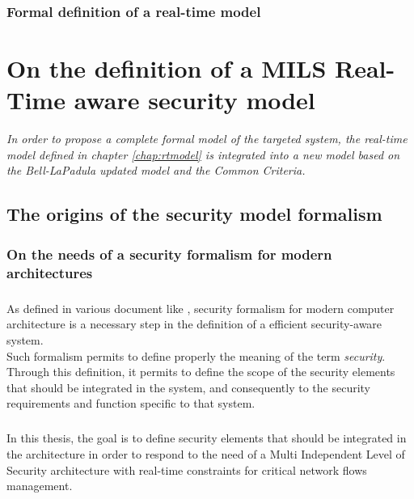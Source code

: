 \subsection{Formal definition of a real-time model}

\paragraph{}

\chapter{On the definition of a MILS Real-Time aware security model}

{\it
In order to propose a complete formal model of the targeted system, the real-time model defined in
chapter \ref{chap:rtmodel} is integrated into a new model based on the Bell-LaPadula updated model
\cite{secmathfund} and the Common Criteria.
}

\doMinitoc

\section{The origins of the security model formalism}

\subsection{On the needs of a security formalism for modern architectures}

\paragraph{}
As defined in various document like \cite{formalsec}, security formalism for modern computer
architecture is a necessary step in the definition of a efficient security-aware system.\\
Such formalism permits to define properly the meaning of the term {\it security}. Through this
definition, it permits to define the scope of the security elements that should be integrated in
the system, and consequently to the security requirements and function specific to that system.

\paragraph{}
In this thesis, the goal is to define security elements that should be integrated in the
architecture in order to respond to the need of a Multi Independent Level of Security architecture
with real-time constraints for critical network flows management.

